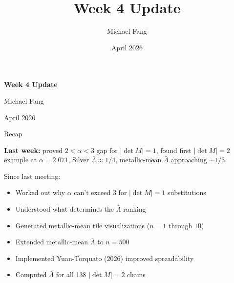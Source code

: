 \documentclass[aspectratio=169, 11pt]{beamer}
\title{Week 4 Update}
\author{Michael Fang}
\date{April 2026}
\begin{document}
\begin{frame}
\centering
\vspace{2em}
{\Large\textbf{Week 4 Update}}

\vspace{1em}
Michael Fang

\vspace{0.5em}
April 2026
\end{frame}

\begin{frame}{Recap}

\small
\textbf{Last week:} proved $2{<}\alpha{<}3$ gap for $|\det M|{=}1$,
found first $|\det M|{=}2$ example at $\alpha=2.071$,
Silver $\bar\Lambda \approx 1/4$, metallic-mean $\bar\Lambda$ approaching ${\sim}1/3$.

\medskip
\normalsize
Since last meeting:
\begin{itemize}
  \item Worked out why $\alpha$ can't exceed 3 for $|\det M|{=}1$ substitutions
  \item Understood what determines the $\bar\Lambda$ ranking
  \item Generated metallic-mean tile visualizations ($n = 1$ through $10$)
  \item Extended metallic-mean $\bar\Lambda$ to $n = 500$
  \item Implemented Yuan-Torquato (2026) improved spreadability
  \item Computed $\bar\Lambda$ for all 138 $|\det M|{=}2$ chains
\end{itemize}

\end{frame}
\note{
}
\end{document}
